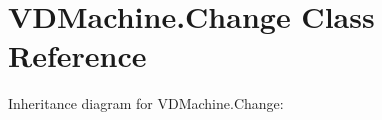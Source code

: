 \hypertarget{class_v_d_machine_1_1_change}{}\section{V\+D\+Machine.\+Change Class Reference}
\label{class_v_d_machine_1_1_change}


Inheritance diagram for V\+D\+Machine.\+Change\+:
